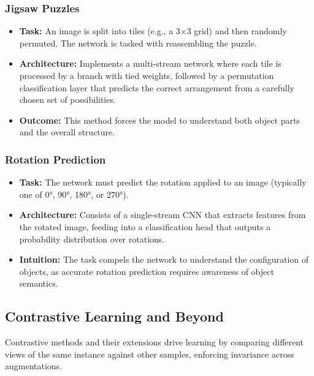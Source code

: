 \documentclass{article}
\begin{document}
\subsubsection{Jigsaw Puzzles}
\begin{itemize}
    \item \textbf{Task:} An image is split into tiles (e.g., a 3$\times$3 grid) and then randomly permuted. The network is tasked with reassembling the puzzle.
    \item \textbf{Architecture:} Implements a multi-stream network where each tile is processed by a branch with tied weights, followed by a permutation classification layer that predicts the correct arrangement from a carefully chosen set of possibilities.
    \item \textbf{Outcome:} This method forces the model to understand both object parts and the overall structure.
\end{itemize}

\subsubsection{Rotation Prediction}
\begin{itemize}
    \item \textbf{Task:} The network must predict the rotation applied to an image (typically one of 0°, 90°, 180°, or 270°).
    \item \textbf{Architecture:} Consists of a single-stream CNN that extracts features from the rotated image, feeding into a classification head that outputs a probability distribution over rotations.
    \item \textbf{Intuition:} The task compels the network to understand the configuration of objects, as accurate rotation prediction requires awareness of object semantics.
\end{itemize}

\subsection{Contrastive Learning and Beyond}

Contrastive methods and their extensions drive learning by comparing different views of the same instance against other samples, enforcing invariance across augmentations.
\end{document}
